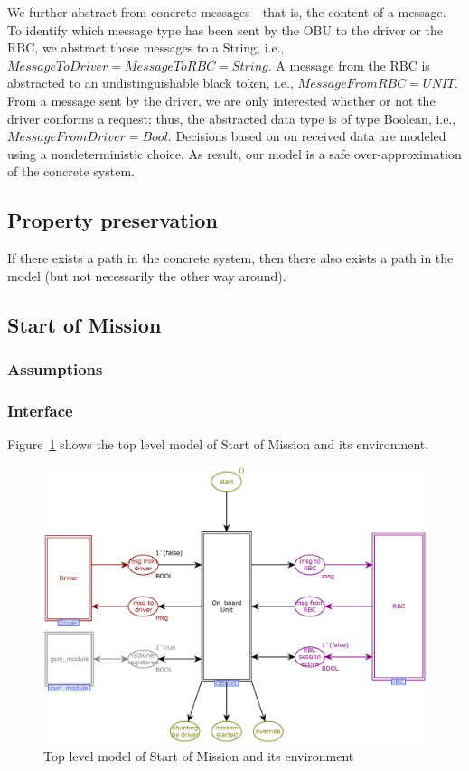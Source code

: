 \documentclass{template/openetcs_article}
\begin{document}
We further abstract from concrete messages---that is, the content of a message. To identify which message type has been sent by the OBU to the driver or the RBC, we abstract those messages to a String, i.e., $\mathit{MessageToDriver} = \mathit{MessageToRBC} = \mathit{String}$. A message from the RBC is abstracted to an undistinguishable black token, i.e., $\mathit{MessageFromRBC} = \mathit{UNIT}$. From a message sent by the driver, we are only interested whether or not the driver conforms a request; thus, the abstracted data type is of type Boolean, i.e., $\mathit{MessageFromDriver} = \mathit{Bool}$. Decisions based on on received data are modeled using a nondeterministic choice. As result, our model is a safe over-approximation of the concrete system.

\subsection{Property preservation}

If there exists a path in the concrete system, then there also exists a path in the model (but not necessarily the other way around).

\subsection{Start of Mission}
\subsubsection{Assumptions}
\subsubsection{Interface}

Figure~\ref{fig:SoM-toplevel} shows the top level model of Start of Mission and its environment. 
\begin{figure}[htb] 
  \centering
  \includegraphics[scale=0.5]{SoM-toplevel.eps}
  \caption{Top level model of Start of Mission and its environment}
  \label{fig:SoM-toplevel}
\end{figure}
\end{document}
